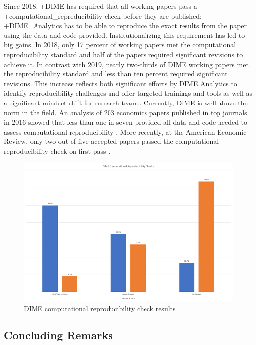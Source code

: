 \documentclass[
]{WileySix}
\begin{document}
Since 2018, +DIME\textbar{} has required that all working papers pass a +computational\_reproducibility\textbar{} check before they are published; +DIME\_Analytics\textbar{} has to be able to reproduce the exact results from the paper using the data and code provided. Institutionalizing this requirement has led to big gains. In 2018, only 17 percent of working papers met the computational reproducibility standard and half of the papers required significant revisions to achieve it. In contrast with 2019, nearly two-thirds of DIME working papers met the reproducibility standard and less than ten percent required significant revisions. This increase reflects both significant efforts by DIME Analytics to identify reproducibility challenges and offer targeted trainings and tools as well as a significant mindset shift for research teams. Currently, DIME is well above the norm in the field. An analysis of 203 economics papers published in top journals in 2016 showed that less than one in seven provided all data and code needed to assess computational reproducibility \citep{galiani2017}. More recently, at the American Economic Review, only two out of five accepted papers passed the computational reproducibility check on first pass \citep{vilhuber2019}.

\begin{figure}
\includegraphics[width=1\linewidth]{./assets/dime/dimefigure6web} \caption{DIME computational reproducibility check results}\label{fig:dimefigure6}
\end{figure}

\hypertarget{concluding-remarks-3}{%
\subsection{Concluding Remarks}\label{concluding-remarks-3}}
\end{document}
